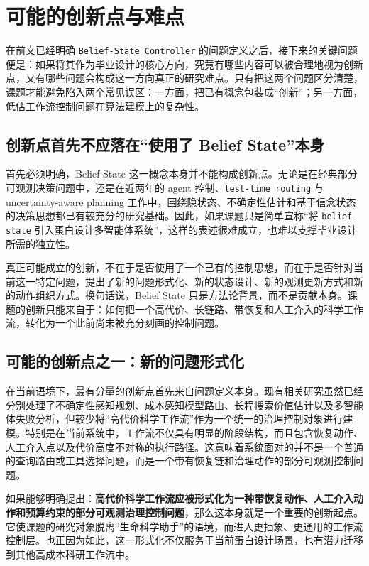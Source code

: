 \section{可能的创新点与难点}

在前文已经明确 \texttt{Belief-State Controller} 的问题定义之后，接下来的关键问题便是：如果将其作为毕业设计的核心方向，究竟有哪些内容可以被合理地视为创新点，又有哪些问题会构成这一方向真正的研究难点。只有把这两个问题区分清楚，课题才能避免陷入两个常见误区：一方面，把已有概念包装成“创新”；另一方面，低估工作流控制问题在算法建模上的复杂性。

\subsection{创新点首先不应落在“使用了 Belief State”本身}

首先必须明确，Belief State 这一概念本身并不能构成创新点。无论是在经典部分可观测决策问题中，还是在近两年的 agent 控制、\texttt{test-time routing} 与 uncertainty-aware planning 工作中，围绕隐状态、不确定性估计和基于信念状态的决策思想都已有较充分的研究基础。因此，如果课题只是简单宣称“将 \texttt{belief-state} 引入蛋白设计多智能体系统”，这样的表述很难成立，也难以支撑毕业设计所需的独立性。

真正可能成立的创新，不在于是否使用了一个已有的控制思想，而在于是否针对当前这一特定问题，提出了新的问题形式化、新的状态设计、新的观测更新方式和新的动作组织方式。换句话说，Belief State 只是方法论背景，而不是贡献本身。课题的创新只能来自于：如何把一个高代价、长链路、带恢复和人工介入的科学工作流，转化为一个此前尚未被充分刻画的控制问题。

\subsection{可能的创新点之一：新的问题形式化}

在当前语境下，最有分量的创新点首先来自问题定义本身。现有相关研究虽然已经分别处理了不确定性感知规划、成本感知模型路由、长程搜索价值估计以及多智能体失败分析，但较少将“高代价科学工作流”作为一个统一的治理控制对象进行建模。特别是在当前系统中，工作流不仅具有明显的阶段结构，而且包含恢复动作、人工介入点以及代价高度不对称的执行路径。这意味着系统面对的并不是一个普通的查询路由或工具选择问题，而是一个带有恢复链和治理动作的部分可观测控制问题。

如果能够明确提出：\textbf{高代价科学工作流应被形式化为一种带恢复动作、人工介入动作和预算约束的部分可观测治理控制问题}，那么这本身就是一个重要的创新起点。它使课题的研究对象脱离“生命科学助手”的语境，而进入更抽象、更通用的工作流控制层。也正因为如此，这一形式化不仅服务于当前蛋白设计场景，也有潜力迁移到其他高成本科研工作流中。

